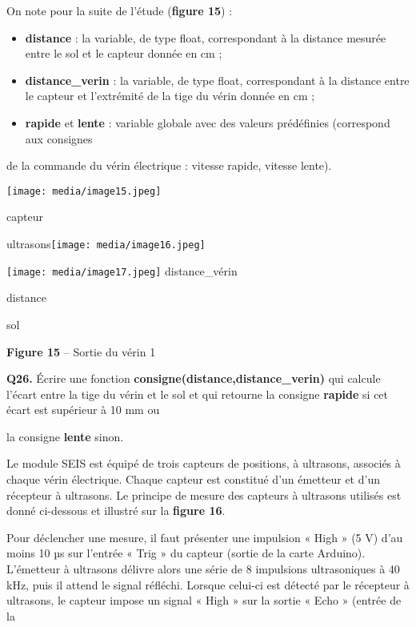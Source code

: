 \documentclass[]{article}
\begin{document}
On note pour la suite de l'étude (\textbf{figure 15}) :

\begin{itemize}
\item
  \textbf{distance} : la variable, de type float, correspondant à la
  distance mesurée entre le sol et le capteur donnée en cm ;
\item
  \textbf{distance\_verin} : la variable, de type float, correspondant à
  la distance entre le capteur et l'extrémité de la tige du vérin donnée
  en cm ;
\item
  \textbf{rapide} et \textbf{lente} : variable globale avec des valeurs
  prédéfinies (correspond aux consignes
\end{itemize}

de la commande du vérin électrique : vitesse rapide, vitesse lente).

\texttt{[image: media/image15.jpeg]}

capteur

ultrasons\texttt{[image: media/image16.jpeg]}

\texttt{[image: media/image17.jpeg]}
distance\_vérin

distance

sol

\textbf{Figure 15} -- Sortie du vérin 1

\textbf{Q26.} Écrire une fonction
\textbf{consigne(distance,distance\_verin)} qui calcule l'écart entre la
tige du vérin et le sol et qui retourne la consigne \textbf{rapide} si
cet écart est supérieur à 10 mm ou

la consigne \textbf{lente} sinon.

\protect\hypertarget{page14}{}{}Le module SEIS est équipé de trois
capteurs de positions, à ultrasons, associés à chaque vérin électrique.
Chaque capteur est constitué d'un émetteur et d'un récepteur à
ultrasons. Le principe de mesure des capteurs à ultrasons utilisés est
donné ci-dessous et illustré sur la \textbf{figure 16}.

Pour déclencher une mesure, il faut présenter une impulsion « High » (5
V) d'au moins 10 µs sur l'entrée « Trig » du capteur (sortie de la carte
Arduino). L'émetteur à ultrasons délivre alors une série de 8 impulsions
ultrasoniques à 40 kHz, puis il attend le signal réfléchi. Lorsque
celui-ci est détecté par le récepteur à ultrasons, le capteur impose un
signal « High » sur la sortie « Echo » (entrée de la
\end{document}
